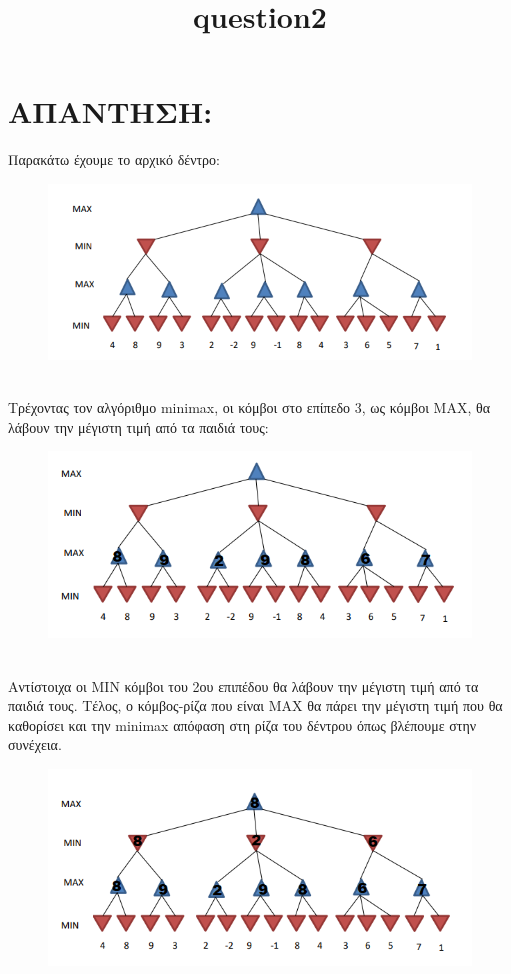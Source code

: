 \documentclass{article}
\begin{document}
\title{\textlatin{question2}}
\maketitle
\section*{ΑΠΑΝΤΗΣΗ:}
Παρακάτω έχουμε το αρχικό δέντρο:
\begin{figure}[h]
    \centering
    \includegraphics[width=1\linewidth]{image.png}
\end{figure}
\\
Τρέχοντας τον αλγόριθμο \textlatin{minimax}, οι κόμβοι στο επίπεδο 3, ως κόμβοι \textlatin{MAX}, θα λάβουν την μέγιστη τιμή από τα παιδιά τους:
\begin{figure}[h]
    \centering
    \includegraphics[width=1\linewidth]{image2.png}
\end{figure}
\\
Αντίστοιχα οι \textlatin{MIN} κόμβοι του 2ου επιπέδου θα λάβουν την μέγιστη τιμή από τα παιδιά τους. Τέλος, ο κόμβος-ρίζα που είναι \textlatin{MAX} θα πάρει την μέγιστη τιμή που θα καθορίσει και την \textlatin{minimax} απόφαση στη ρίζα του δέντρου όπως βλέπουμε στην συνέχεια.
\\
\begin{figure}[h]
    \centering
    \includegraphics[width=1\linewidth]{image3.png}
\end{figure}
\end{document}
